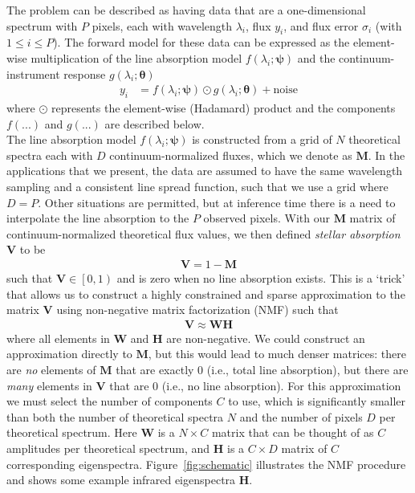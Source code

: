 \documentclass[modern]{aastex631}
\renewcommand{\vec}[1]{\mathbf{#1}}
\newcommand{\vectheta}{\boldsymbol{\theta}}
\newcommand{\vecpsi}{\boldsymbol{\psi}}
\newcommand{\vecV}{\mathbf{V}}
\newcommand{\hadamard}{\odot}
\begin{document}
The problem can be described as having data that are a one-dimensional spectrum with $P$ pixels, each with wavelength $\lambda_i$, flux $y_i$, and flux error $\sigma_i$ (with $1 \leq i \leq P$). The forward model for these data can be expressed as the element-wise multiplication of the line absorption model $f(\lambda_i; \vecpsi)$ and the continuum-instrument response $g(\lambda_i;\vectheta)$
\begin{align}
    y_i &= f(\lambda_i;\vecpsi)\hadamard{}g(\lambda_i;\vectheta) + \mbox{noise}
\end{align}
where $\hadamard$ represents the element-wise (Hadamard) product and the components $f(...)$ and $g(...)$ are described below.\\


The line absorption model $f(\lambda_i;\vecpsi)$ is constructed from a grid of $N$ theoretical spectra each with $D$  continuum-normalized fluxes, which we denote as $\vec{M}$. In the applications that we present, the data are assumed to have the same wavelength sampling and a consistent line spread function, such that we use a grid where $D = P$. Other situations are permitted, but at inference time there is a need to interpolate the line absorption to the $P$ observed pixels. With our $\vec{M}$ matrix of continuum-normalized theoretical flux values, we then defined \emph{stellar absorption} $\vecV$ to be
\begin{align}
    \vec{V} = 1 - \vec{M}
\end{align}
such that $\vec{V} \in \left[0, 1\right)$ and is zero when no line absorption exists. This is a `trick' that allows us to construct a highly constrained and sparse approximation to the matrix $\vecV$ using non-negative matrix factorization (NMF) such that 
\begin{align}
    \vec{V} \approx \vec{W}\vec{H} \label{eq:nmf}
\end{align}
where all elements in $\vec{W}$ and $\vec{H}$ are non-negative. 
We could construct an approximation directly to $\vec{M}$, but this would lead to much denser matrices: there are \emph{no} elements of $\vec{M}$ that are exactly 0 (i.e., total line absorption), but there are \emph{many} elements in $\vec{V}$ that are 0 (i.e., no line absorption). For this approximation we must select the number of components $C$ to use, which is significantly smaller than both the number of theoretical spectra $N$ and the number of pixels $D$ per theoretical spectrum. Here $\vec{W}$ is a $N \times C$ matrix that can be thought of as $C$ amplitudes per theoretical spectrum, and $\vec{H}$ is a $C \times D$ matrix of $C$ corresponding eigenspectra. Figure~\ref{fig:schematic} illustrates the NMF procedure and shows some example infrared eigenspectra $\vec{H}$. \\
\end{document}
